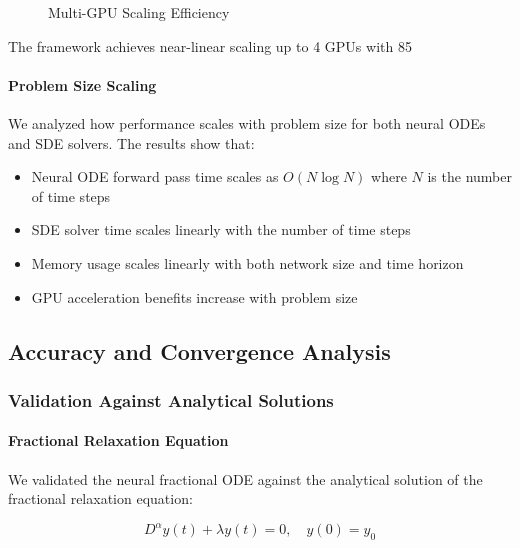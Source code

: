 \begin{figure}[h]
\centering
\caption{Multi-GPU Scaling Efficiency}
\label{fig:multi_gpu_scaling}
\end{figure}

The framework achieves near-linear scaling up to 4 GPUs with 85%

\paragraph{Problem Size Scaling}
We analyzed how performance scales with problem size for both neural ODEs and SDE solvers. The results show that:

\begin{itemize}
    \item Neural ODE forward pass time scales as $O(N \log N)$ where $N$ is the number of time steps
    \item SDE solver time scales linearly with the number of time steps
    \item Memory usage scales linearly with both network size and time horizon
    \item GPU acceleration benefits increase with problem size
\end{itemize}

\subsection{Accuracy and Convergence Analysis}

\subsubsection{Validation Against Analytical Solutions}

\paragraph{Fractional Relaxation Equation}
We validated the neural fractional ODE against the analytical solution of the fractional relaxation equation:

\begin{equation}
D^{\alpha} y(t) + \lambda y(t) = 0, \quad y(0) = y_0
\end{equation}

